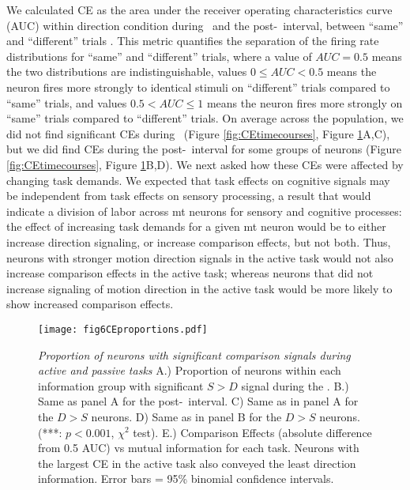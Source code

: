 We calculated CE as the area under the receiver operating characteristics curve (AUC) within direction condition during \test\ and the post-\test\ interval, between ``same'' and ``different'' trials \parencite{Lui2011}. 
This metric quantifies the separation of the firing rate distributions for ``same'' and ``different'' trials, where a value of $AUC = 0.5$ means the two distributions are indistinguishable, values  $0 \le AUC < 0.5$ means the neuron fires more strongly to identical stimuli on ``different'' trials compared to ``same'' trials, and values $0.5 < AUC \le 1$ means the neuron fires more strongly on ``same'' trials compared to ``different'' trials.
On average across the population, we did not find significant CEs during \test\ (Figure \ref{fig:CEtimecourses}, Figure \ref{fig:CEproportions}A,C), but we did find CEs during the post-\test\ interval for some groups of neurons (Figure \ref{fig:CEtimecourses}, Figure \ref{fig:CEproportions}B,D).\label{rev:cePop}
We next asked how these CEs were affected by changing task demands. We expected that task effects on cognitive signals may be independent from task effects on sensory processing, a result that would indicate a division of labor across \gls{mt} neurons for sensory and cognitive processes: the effect of increasing task demands for a given \gls{mt} neuron would be to either increase direction signaling, or increase comparison effects, but not both. 
Thus, neurons with stronger motion direction signals in the active task would not also increase comparison effects in the active task; whereas neurons that did not increase signaling of motion direction in the active task would be more likely to show increased comparison effects.\label{rev:ceLogicRes}


	\addtocounter{page}{-1}
	\thispagestyle{empty}
	\begin{figure}
		{\caption{{\it Proportion of neurons with significant comparison signals during active and passive tasks} A.) Proportion of neurons within each information group with significant $S>D$ signal during the \test. B.) Same as panel A for the post-\test\ interval. C) Same as in panel A for the $D>S$ neurons. D) Same as in panel B for the $D>S$ neurons. (***: $p<0.001$, $\chi^2$ test). E.) Comparison Effects (absolute difference from 0.5 AUC) vs mutual information for each task. Neurons with the largest CE in the active task also conveyed the least direction information. Error bars = 95\% binomial confidence intervals.}
			\label{fig:CEproportions}}
		{\texttt{[image: fig6CEproportions.pdf]}}
	\end{figure}
	\clearpage


